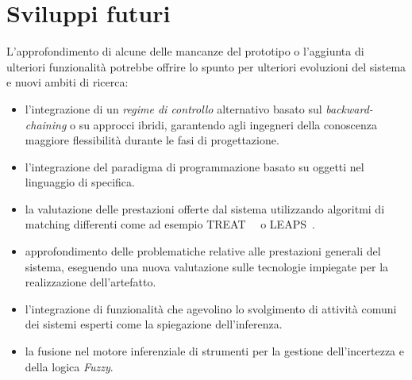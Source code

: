 \section*{Sviluppi futuri}

L'approfondimento di alcune delle mancanze del prototipo o l'aggiunta di ulteriori funzionalità potrebbe offrire lo spunto per ulteriori evoluzioni del sistema e nuovi ambiti di ricerca:
\begin{itemize}
	\item l'integrazione di un \emph{regime di controllo} alternativo basato sul \emph{backward-chaining} o su approcci ibridi, garantendo agli ingegneri della conoscenza maggiore flessibilità durante le fasi di progettazione.
	
	\item l'integrazione del paradigma di programmazione basato su oggetti nel linguaggio di specifica.
	
	\item la valutazione delle prestazioni offerte dal sistema utilizzando algoritmi di matching differenti come ad esempio TREAT~\cite{Miranker:1987:TBM:899610}~\cite{Miranker:1987:TBM:1856670.1856678} o LEAPS~\cite{Batory:1994:LA:899216}.	
	
	\item approfondimento delle problematiche relative alle prestazioni generali del sistema, eseguendo una nuova valutazione sulle tecnologie impiegate per la realizzazione dell'artefatto.
	
	\item l'integrazione di funzionalità che agevolino lo svolgimento di attività comuni  dei sistemi esperti come la spiegazione dell'inferenza.
	
	\item la fusione nel motore inferenziale di strumenti per la gestione dell'incertezza e della logica \emph{Fuzzy}.
\end{itemize}
